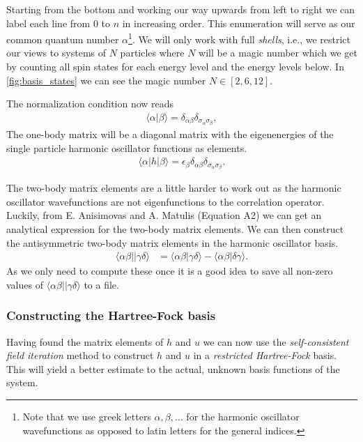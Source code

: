 \documentclass[
    a4paper, aps, twocolumn, floatfix, superscriptaddress,
    nofootinbib]{revtex4-1}
\newcommand{\1}{\mathds{1}}
\newcommand{\bra}[1]{\langle #1\lvert}
\newcommand{\ket}[1]{\rvert #1\rangle}
\newcommand{\braket}[2]{\langle #1 \vert #2 \rangle}
\begin{document}
            Starting from the bottom and working our way upwards from left to
            right we can label each line from $0$ to $n$ in increasing
            order. This enumeration will serve as our common quantum number
            $\alpha$\footnote{Note that we use greek letters $\alpha, \beta,
            \dots$ for the harmonic oscillator wavefunctions as opposed to latin
            letters for the general indices.}. We will only work with full
            \emph{shells}, i.e., we restrict our views to systems of $N$
            particles where $N$ will be a magic number which we get by counting
            all spin states for each energy level and the energy levels below.
            In \autoref{fig:basis_states} we can see the magic number $N \in [2,
            6, 12]$.

            The normalization condition now reads
            \begin{align}
                \braket{\alpha}{\beta}
                = \delta_{\alpha\beta}\delta_{\sigma_\alpha\sigma_\beta},
            \end{align}
            The one-body matrix will be a diagonal matrix with the eigenenergies
            of the single particle harmonic oscillator functions as elements.
            \begin{align}
                \bra{\alpha}h\ket{\beta}
                = \epsilon_{\beta}
                \delta_{\alpha\beta}\delta_{\sigma_\alpha\sigma_\beta}.
            \end{align}

            The two-body matrix elements are a little harder to work out as the
            harmonic oscillator wavefunctions are not eigenfunctions to the
            correlation operator. Luckily, from E. Anisimovas and A.  Matulis
            (Equation A2)\cite{anisimovas1998energy} we can get an analytical
            expression for the two-body matrix elements. We can then construct
            the antisymmetric two-body matrix elements in the harmonic
            oscillator basis.
            \begin{align}
                \bra{\alpha\beta}\ket{\gamma\delta}
                &= \braket{\alpha\beta}{\gamma\delta}
                - \braket{\alpha\beta}{\delta\gamma}.
            \end{align}
            As we only need to compute these once it is a good idea to save all
            non-zero values of $\bra{\alpha\beta}\ket{\gamma\delta}$ to a file.

        \subsubsection{Constructing the Hartree-Fock basis}
            Having found the matrix elements of $h$ and $u$ we can now use the
            \emph{self-consistent field iteration} method to construct $h$ and
            $u$ in a \emph{restricted Hartree-Fock} basis. This will yield a
            better estimate to the actual, unknown basis functions of the
            system.
\end{document}
